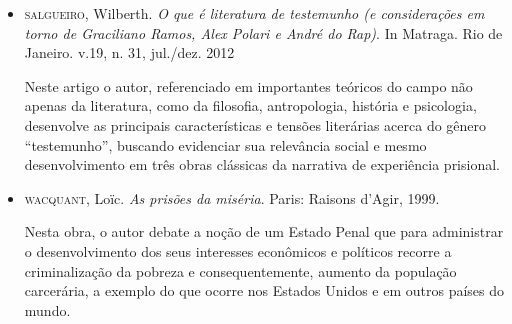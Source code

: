 \documentclass[11pt]{extarticle}
\begin{document}
\begin{itemize}
\item\textsc{salgueiro}, Wilberth. \textit{O que é literatura de testemunho (e considerações
em torno de Graciliano Ramos, Alex Polari e André do Rap)}. In Matraga.
Rio de Janeiro. v.19, n. 31, jul./dez. 2012  

Neste artigo o autor, referenciado em importantes teóricos do campo não apenas 
da literatura, como da filosofia, antropologia, história e psicologia, desenvolve as
principais características e tensões literárias acerca do gênero
``testemunho'', buscando evidenciar sua relevância social e mesmo
desenvolvimento em três obras clássicas da narrativa de experiência
prisional.



\item\textsc{wacquant}, Loïc. \textit{As prisões da miséria}. Paris: Raisons d'Agir,
1999. 

Nesta obra, o autor debate a noção de um Estado Penal que para
administrar o desenvolvimento dos seus interesses econômicos e políticos
recorre a criminalização da pobreza e consequentemente, aumento da
população carcerária, a exemplo do que ocorre nos Estados Unidos e em
outros países do mundo.
\end{itemize}
\end{document}
